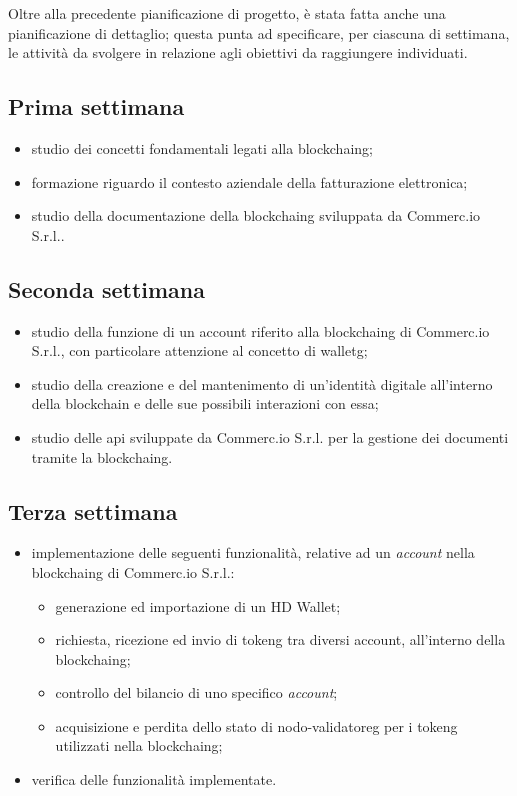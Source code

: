Oltre alla precedente pianificazione di progetto, è stata fatta anche una pianificazione di dettaglio; questa punta ad specificare, per ciascuna di settimana, le attività da svolgere in relazione agli obiettivi da raggiungere individuati.

\subsection{Prima settimana}
\begin{itemize}
	\item studio dei concetti fondamentali legati alla \gls{blockchaing};
	\item formazione riguardo il contesto aziendale della fatturazione elettronica;
	\item studio della documentazione della \gls{blockchaing} sviluppata da Commerc.io S.r.l..
\end{itemize}

\subsection{Seconda settimana} 
\begin{itemize}
	\item studio della funzione di un account riferito alla \gls{blockchaing} di Commerc.io S.r.l., con particolare attenzione al concetto di \gls{walletg}\glsfirstoccur;
	\item studio della creazione e del mantenimento di un'identità digitale all'interno della blockchain e delle sue possibili interazioni con essa;
	\item studio delle \gls{api} sviluppate da Commerc.io S.r.l. per la gestione dei documenti tramite la \gls{blockchaing}.
\end{itemize}

\subsection{Terza settimana}
\begin{itemize}
	\item implementazione delle seguenti funzionalità, relative ad un \textit{account} nella \gls{blockchaing} di Commerc.io S.r.l.:
	\begin{itemize}
		\item generazione ed importazione di un HD Wallet;
		\item richiesta, ricezione ed invio di \gls{tokeng}\glsfirstoccur{} tra diversi account, all'interno della \gls{blockchaing};
		\item controllo del bilancio di uno specifico \textit{account};
		\item acquisizione e perdita dello stato di \gls{nodo-validatoreg}\glsfirstoccur{} per i \gls{tokeng} utilizzati nella \gls{blockchaing};
	\end{itemize}
	\item verifica delle funzionalità implementate.
\end{itemize}

